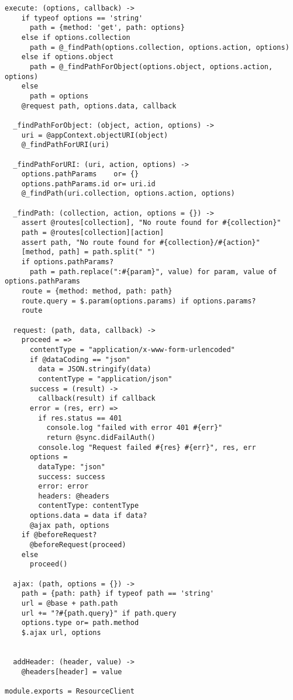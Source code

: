 \begin{lstlisting}[caption=resource\_client.coffee]
  execute: (options, callback) ->
    if typeof options == 'string'
      path = {method: 'get', path: options}
    else if options.collection
      path = @_findPath(options.collection, options.action, options)
    else if options.object
      path = @_findPathForObject(options.object, options.action, options)
    else
      path = options
    @request path, options.data, callback

  _findPathForObject: (object, action, options) ->
    uri = @appContext.objectURI(object)
    @_findPathForURI(uri)
  
  _findPathForURI: (uri, action, options) ->
    options.pathParams    or= {}
    options.pathParams.id or= uri.id
    @_findPath(uri.collection, options.action, options)

  _findPath: (collection, action, options = {}) ->
    assert @routes[collection], "No route found for #{collection}"
    path = @routes[collection][action]
    assert path, "No route found for #{collection}/#{action}"
    [method, path] = path.split(" ")
    if options.pathParams?
      path = path.replace(":#{param}", value) for param, value of options.pathParams
    route = {method: method, path: path}
    route.query = $.param(options.params) if options.params?
    route

  request: (path, data, callback) ->
    proceed = =>
      contentType = "application/x-www-form-urlencoded"
      if @dataCoding == "json"
        data = JSON.stringify(data)
        contentType = "application/json" 
      success = (result) ->
        callback(result) if callback
      error = (res, err) =>
        if res.status == 401
          console.log "failed with error 401 #{err}"
          return @sync.didFailAuth()
        console.log "Request failed #{res} #{err}", res, err
      options = 
        dataType: "json"
        success: success
        error: error
        headers: @headers
        contentType: contentType
      options.data = data if data?
      @ajax path, options
    if @beforeRequest?
      @beforeRequest(proceed)
    else
      proceed()
  
  ajax: (path, options = {}) ->
    path = {path: path} if typeof path == 'string'
    url = @base + path.path
    url += "?#{path.query}" if path.query
    options.type or= path.method
    $.ajax url, options
    

  addHeader: (header, value) ->
    @headers[header] = value

module.exports = ResourceClient
\end{lstlisting}

